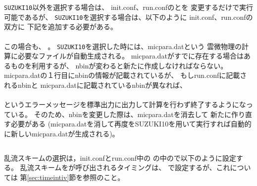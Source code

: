 \verb|SUZUKI10|以外を選択する場合は、
init.conf、run.confのとを
変更するだけで実行可能であるが、
{\color{red}\verb|SUZUKI10|を選択する場合}は、以下のように
init.conf、run.confの双方に
下記を追加する必要がある。\\

\\

この場合も、
{\color{red}{init.confとrun.confに記載される\verb|PARAM_BIN|は同一にする必要がある}}。
\verb|SUZUKI10|を選択した時には、micpara.datという
雲微物理の計算に必要なファイルが自動生成される。
micpara.datがすでに存在する場合はあるものを利用するが、
nbinが変わると新たに作成しなければならない。
micpara.datの１行目にnbinの情報が記載されているが、
もしrun.confに記載されるnbinと
micpara.datに記載されているnbinが異なれば、\\

\\

\noindent というエラーメッセージを標準出力に出力して計算を行わず終了するようになっている。
そのため、nbinを変更した際は、micpara.datを消去して
新たに作り直す必要がある
(micpara.datを消して再度\scalerm をSUZUKI10を用いて実行すれば自動的に新しいmicpara.datが生成される)。



\subsection{\SubsecTurbulenceSetting} \label{subsec:basic_usel_turbulence}

乱流スキームの選択は，init.confとrun.conf中の
の中ので以下のように設定する。
乱流スキームをが呼び出されるタイミングは、
で設定するが、これについては
第\ref{sec:timeintiv}節を参照のこと。\\

